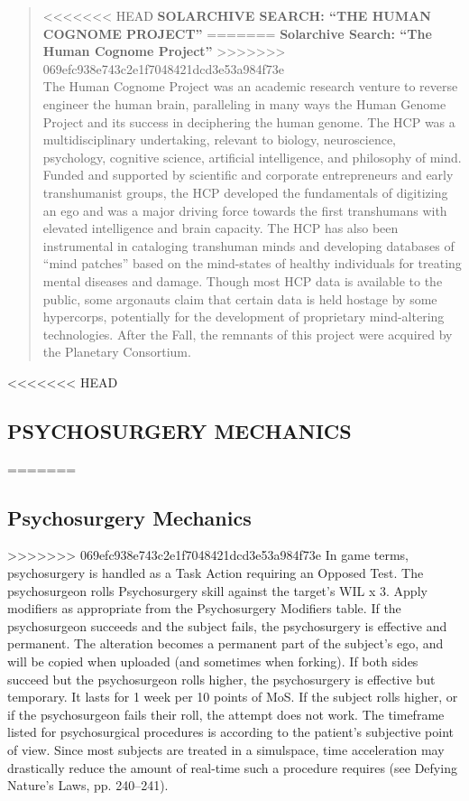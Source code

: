\begin{quotation}
<<<<<<< HEAD
\textbf{SOLARCHIVE SEARCH: “THE HUMAN COGNOME PROJECT” }
=======
\textbf{Solarchive Search: “The Human Cognome Project” }
>>>>>>> 069efc938e743c2e1f7048421dcd3e53a984f73e
\\
The Human Cognome Project was an
academic research venture to reverse
engineer the human brain, paralleling
in many ways the Human Genome
Project and its success in deciphering
the human genome. The HCP was a
multidisciplinary undertaking, relevant
to biology, neuroscience, psychology,
cognitive science, artificial intelligence,
and philosophy of mind.
Funded and supported by scientific
and corporate entrepreneurs and early
transhumanist groups, the HCP developed
the fundamentals of digitizing an ego
and was a major driving force towards
the first transhumans with elevated
intelligence and brain capacity. The HCP
has also been instrumental in cataloging
transhuman minds and developing
databases of “mind patches” based on
the mind-states of healthy individuals for
treating mental diseases and damage.
Though most HCP data is available to the
public, some argonauts claim that certain
data is held hostage by some hypercorps,
potentially for the development of proprietary
mind-altering technologies.
After the Fall, the remnants of this
project were acquired by the Planetary
Consortium.
\end{quotation}

<<<<<<< HEAD
\subsection{PSYCHOSURGERY MECHANICS}
=======
\subsection{Psychosurgery Mechanics}
>>>>>>> 069efc938e743c2e1f7048421dcd3e53a984f73e
In game terms, psychosurgery is handled as a Task
Action requiring an Opposed Test. The psychosurgeon
rolls Psychosurgery skill against the target’s WIL x 3.
Apply modifiers as appropriate from the Psychosurgery
Modifiers table.
If the psychosurgeon succeeds and the subject fails,
the psychosurgery is effective and permanent. The
alteration becomes a permanent part of the subject’s
ego, and will be copied when uploaded (and sometimes
when forking).
If both sides succeed but the psychosurgeon rolls
higher, the psychosurgery is effective but temporary. It
lasts for 1 week per 10 points of MoS.
If the subject rolls higher, or if the psychosurgeon
fails their roll, the attempt does not work.
The timeframe listed for psychosurgical procedures
is according to the patient’s subjective point of view.
Since most subjects are treated in a simulspace, time
acceleration may drastically reduce the amount of
real-time such a procedure requires (see Defying Nature’s
Laws, pp. 240–241).


